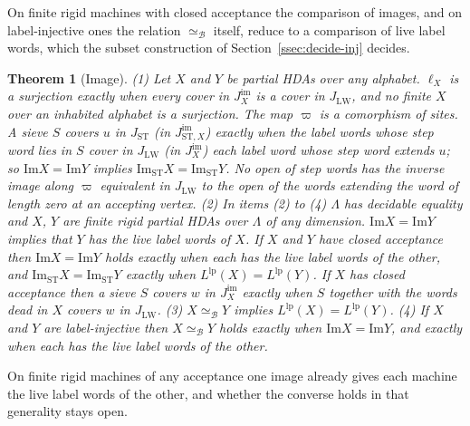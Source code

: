 \documentclass{lmcs}
\newtheorem{theorem}{Theorem}[section]
\theoremstyle{definition}
\theoremstyle{remark}
\newcommand{\JLW}{J_{\LW}}
\newcommand{\LW}{\mathrm{LW}}
\providecommand{\LangLp}[1]{L^{\mathrm{lp}}(#1)}
\providecommand{\JSW}{J_{\mathrm{ST}}}
\providecommand{\fgt}{\varpi}
\providecommand{\JimS}[1]{J^{\mathrm{im}}_{\mathrm{ST},#1}}
\providecommand{\eqB}{\simeq_{\mathcal{B}}}
\providecommand{\Ima}{\mathrm{Im}}
\providecommand{\ImaST}{\mathrm{Im}_{\mathrm{ST}}}
\providecommand{\Jim}[1]{J^{\mathrm{im}}_{#1}}
\begin{document}
On finite rigid machines with closed acceptance the comparison of images, and on label-injective ones the relation $\eqB$ itself, reduce to
a comparison of live label words, which the subset construction of Section~\ref{ssec:decide-inj} decides.

\begin{theorem}[Image]\label{thm:image-live}
(1) Let $X$ and $Y$ be partial HDAs over any alphabet. $\ell_X$ is a surjection exactly when every cover in $\Jim{X}$ is a cover in
$\JLW$, and no finite $X$ over an inhabited alphabet is a
surjection. The map $\fgt$ is a comorphism of sites. A sieve $S$ covers $u$ in $\JSW$ (in
$\JimS{X}$) exactly when the label words whose step word lies in $S$ cover in $\JLW$ (in $\Jim{X}$) each label word
whose step word extends $u$; so $\Ima X=\Ima Y$ implies
$\ImaST X=\ImaST Y$. No open of step words has the inverse image along $\fgt$
equivalent in $\JLW$ to the open of the words extending the word of length zero at an
accepting vertex.
(2) In items (2) to (4) $\Lambda$ has decidable equality and $X$, $Y$ are finite rigid partial HDAs over $\Lambda$
of any dimension. $\Ima X=\Ima Y$ implies that $Y$ has the live label words of $X$.
If $X$ and $Y$ have closed acceptance then $\Ima X=\Ima Y$ holds exactly when each has the live label words of
the other, and $\ImaST X=\ImaST Y$ exactly when
$\LangLp{X}=\LangLp{Y}$. If $X$ has closed acceptance then a sieve $S$ covers
$w$ in $\Jim{X}$ exactly when $S$ together with the words dead in $X$ covers $w$ in
$\JLW$.
(3) $X\eqB Y$ implies $\LangLp{X}=\LangLp{Y}$.
(4) If $X$ and $Y$ are label-injective then $X\eqB Y$ holds exactly when $\Ima X=\Ima
Y$, and exactly when each has the live label words of the
other.
\end{theorem}

On finite rigid machines of any acceptance one image already gives each machine the live label words of the other, and whether the converse holds in that generality stays open.
\end{document}
